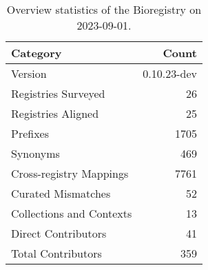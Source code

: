\begin{table}
\caption{Overview statistics of the Bioregistry on 2023-09-01.}
\label{tab:bioregistry-summary}
\begin{tabular}{lr}
\toprule
Category & Count \\
\midrule
Version & 0.10.23-dev \\
Registries Surveyed & 26 \\
Registries Aligned & 25 \\
Prefixes & 1705 \\
Synonyms & 469 \\
Cross-registry Mappings & 7761 \\
Curated Mismatches & 52 \\
Collections and Contexts & 13 \\
Direct Contributors & 41 \\
Total Contributors & 359 \\
\bottomrule
\end{tabular}
\end{table}

